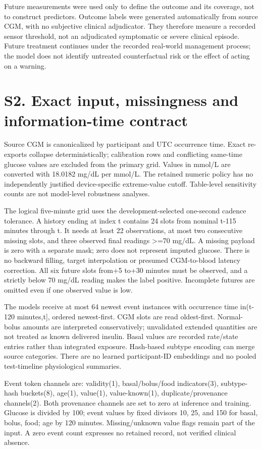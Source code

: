 \documentclass[11pt,a4paper]{article}
\begin{document}
Future measurements were used only to define the outcome and its coverage, not to construct predictors. Outcome labels were generated automatically from source CGM, with no subjective clinical adjudicator. They therefore measure a recorded sensor threshold, not an adjudicated symptomatic or severe clinical episode. Future treatment continues under the recorded real-world management process; the model does not identify untreated counterfactual risk or the effect of acting on a warning.

\section*{S2. Exact input, missingness and information-time contract}
Source CGM is canonicalized by participant and UTC occurrence time. Exact re-exports collapse deterministically; calibration rows and conflicting same-time glucose values are excluded from the primary grid. Values in mmol/L are converted with 18.0182 mg/dL per mmol/L. The retained numeric policy has no independently justified device-specific extreme-value cutoff. Table-level sensitivity counts are not model-level robustness analyses.

The logical five-minute grid uses the development-selected one-second cadence tolerance. A history ending at index t contains 24 slots from nominal t-115 minutes through t. It needs at least 22 observations, at most two consecutive missing slots, and three observed final readings >=70 mg/dL. A missing payload is zero with a separate mask; zero does not represent imputed glucose. There is no backward filling, target interpolation or presumed CGM-to-blood latency correction. All six future slots from+5 to+30 minutes must be observed, and a strictly below 70 mg/dL reading makes the label positive. Incomplete futures are omitted even if one observed value is low.

The models receive at most 64 newest event instances with occurrence time in(t-120 minutes,t], ordered newest-first. CGM slots are read oldest-first. Normal-bolus amounts are interpreted conservatively; unvalidated extended quantities are not treated as known delivered insulin. Basal values are recorded rate/state entries rather than integrated exposure. Hash-based subtype encoding can merge source categories. There are no learned participant-ID embeddings and no pooled test-timeline physiological summaries.

Event token channels are: validity(1), basal/bolus/food indicators(3), subtype-hash buckets(8), age(1), value(1), value-known(1), duplicate/provenance channels(2). Both provenance channels are set to zero at inference and training. Glucose is divided by 100; event values by fixed divisors 10, 25, and 150 for basal, bolus, food; age by 120 minutes. Missing/unknown value flags remain part of the input. A zero event count expresses no retained record, not verified clinical absence.
\end{document}
